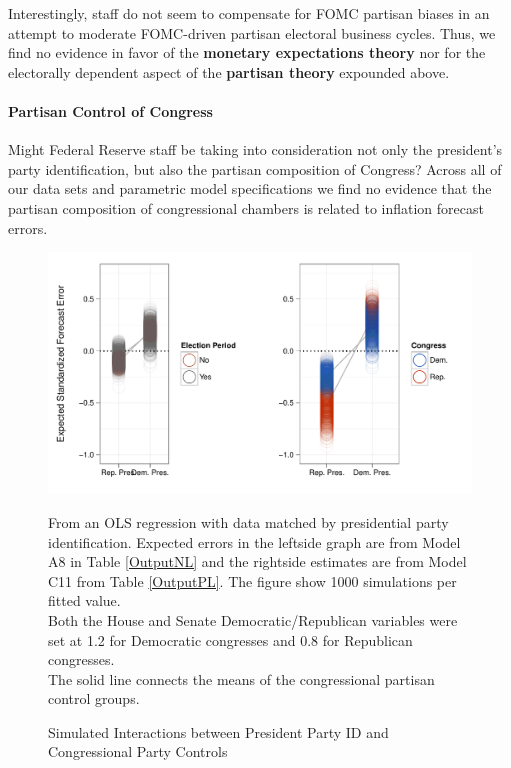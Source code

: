 \documentclass[a4paper]{article}\usepackage{graphicx, color}
\newenvironment{knitrout}{}{} %
\begin{document}
Interestingly, staff do not seem to compensate for FOMC partisan biases in an attempt to moderate FOMC-driven partisan electoral business cycles. Thus, we find no evidence in favor of the {\bf{monetary expectations theory}} nor for the electorally dependent aspect of the {\bf{partisan theory}} expounded above.

\paragraph{Partisan Control of Congress}

Might Federal Reserve staff be taking into consideration not only the president's party identification, but also the partisan composition of Congress?  Across all of our data sets and parametric model specifications we find no evidence that the partisan composition of congressional chambers is related to inflation forecast errors. 

\begin{figure}[t]
    \caption{Simulated Interactions between President Party ID and Congressional Party Controls}
    \label{InterPlot}
    \begin{center}

\begin{knitrout}
\color{fgcolor}\includegraphics[width=0.9\linewidth]{figure/InterPlot} 
\end{knitrout}


    \end{center}
    \begin{singlespace}
        {\scriptsize{From an OLS regression with data matched by presidential party identification. Expected errors in the leftside graph are from Model A8 in Table \ref{OutputNL} and the rightside estimates are from Model C11 from Table \ref{OutputPL}. The figure show 1000 simulations per fitted value. \\ Both the House and Senate Democratic/Republican variables were set at 1.2 for Democratic congresses and 0.8 for Republican congresses. \\ The solid line connects the means of the congressional partisan control groups.}}
    \end{singlespace}
\end{figure}
\end{document}
